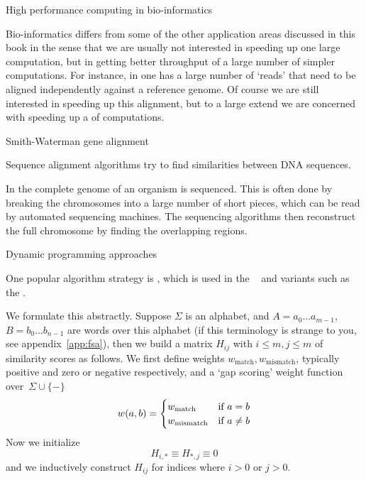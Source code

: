 
 {High performance computing in bio-informatics}

Bio-informatics differs from some of the other application areas
discussed in this book in the sense that we are usually not interested
in speeding up one large computation, but in getting better throughput
of a large number of simpler computations. For instance, in
 one has a large number of `reads' that need
to be aligned independently against a reference genome. Of course we
are still interested in speeding up this alignment, but to a large
extend we are concerned with speeding up a
 of computations.

 {Smith-Waterman gene alignment}

Sequence alignment algorithms try to find similarities between 
DNA sequences.

In  the complete genome of an 
organism is sequenced. This is often done by breaking the chromosomes
into a large number of short pieces, which can be read by automated
sequencing machines. The sequencing algorithms then reconstruct
the full chromosome by finding the overlapping regions.

 {Dynamic programming approaches}
\label{sec:smithwaterman}

One popular  algorithm strategy is
, which is used in the
~\cite{NeedlemanWunsch}
and variants such as the
.

We formulate this abstractly. Suppose $\Sigma$ is an alphabet, 
and $A=a_0\ldots a_{m-1}$, $B=b_0\ldots b_{n-1}$ are words over this alphabet
(if this terminology is strange to you, see appendix~\ref{app:fsa}),
then we build a matrix $H_{ij}$ with $i\leq m, j\leq m$
of similarity scores as follows.
%
\newcommand\wm{w_{\mathrm{match}}}
\newcommand\ws{w_{\mathrm{mismatch}}}
\newcommand\wdel{w_{\mathrm{deletion}}}
We first define weights $\wm,\ws$, typically positive and zero or negative 
respectively, and a `gap scoring' weight function over~$\Sigma\cup\{-\}$
\[ w(a,b)=
\begin{cases}
  \wm&\hbox{if $a=b$}\\ \ws&\hbox{if $a\not=b$}
\end{cases}
\]
Now we initialize
\[ H_{i,*}\equiv H_{*,j}\equiv 0 \]
and we inductively construct $H_{ij}$ for indices where $i>0$ or $j>0$.

